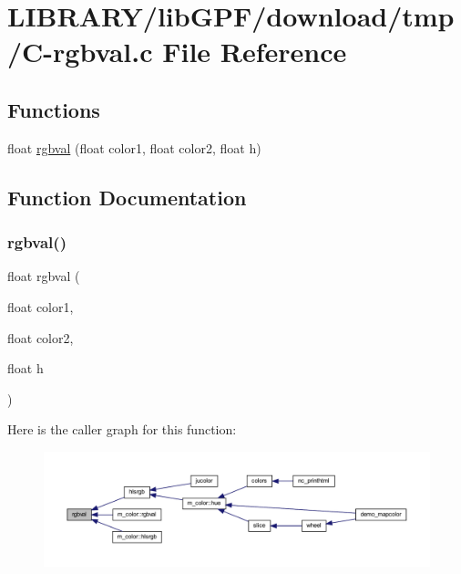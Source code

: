 \hypertarget{C-rgbval_8c}{}\section{L\+I\+B\+R\+A\+R\+Y/lib\+G\+P\+F/download/tmp/\+C-\/rgbval.c File Reference}
\label{C-rgbval_8c}
\subsection*{Functions}
\begin{DoxyCompactItemize}
\item 
float \hyperlink{C-rgbval_8c_a44944ef0b70e4ce364fa785ff6750eac}{rgbval} (float color1, float color2, float h)
\end{DoxyCompactItemize}


\subsection{Function Documentation}
\mbox{\label{C-rgbval_8c_a44944ef0b70e4ce364fa785ff6750eac}} 
\subsubsection{\texorpdfstring{rgbval()}{rgbval()}}
{\footnotesize\ttfamily float rgbval (\begin{DoxyParamCaption}\item[{float}]{color1,  }\item[{float}]{color2,  }\item[{float}]{h }\end{DoxyParamCaption})}

Here is the caller graph for this function\+:
\nopagebreak
\begin{figure}[H]
\begin{center}
\leavevmode
\includegraphics[width=350pt]{C-rgbval_8c_a44944ef0b70e4ce364fa785ff6750eac_icgraph}
\end{center}
\end{figure}
